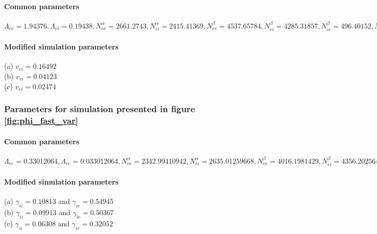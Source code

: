 \documentclass[a4paper,12pt]{article}
\begin{document}
\paragraph{Common parameters}
$\Lambda_{ee} = 1.94376, \Lambda_{ei} = 0.19438, N^{\alpha}_{ee} = 2661.2743, N^{\alpha}_{ei} = 2415.41369,
N^{\beta}_{ee} = 4537.65784, N^{\beta}_{ei} = 4285.31857, N^{\beta}_{ie} = 496.40152, N^{\beta}_{ii} = 989.81774,
\Gamma_{ee} = 0.42627, \Gamma_{ei} = 1.71876, \Gamma_{ie} = 0.85708, \Gamma_{ii} = 1.32239,
\gamma_{ee} = 0.78950, \gamma_{ei} = 0.82632, \gamma_{ie} = 0.14777,
\gamma_{ii} = 0.04887, h_e^{rest} = -75.54581, h_{ee}^{eq} = -16.50733, h_{ei}^{eq} = -2.72987,
h_i^{rest} = -75.55675, h_{ie}^{eq} = -88.67197, h_{ii}^{eq} = -85.43396, \mu_e = -42.50181, \mu_i = -48.70101, 
p_{ee} = 7.18587, p_{ei} = 6.79444, p_{ie} = 0.0, p_{ii} = 0.0, phi_{ie} = 0,
\phi_{ii} = 0, S_e^{max} = 0.45018, S_i^{max} = 0.07468, \sigma_e = 5.02482,
\sigma_i = 3.22531, \tau_e = 38.9, \tau_i = 137.859, v_{ee} = 0.82458$
\paragraph{Modified simulation parameters}
(a) $v_{ei} = 0.16492$\\
(b) $v_{ei} = 0.04123$\\
(c) $v_{ei} = 0.02474$\\


\subsubsection{Parameters for simulation presented in figure \ref{fig:phi_fast_var}}
\paragraph{Common parameters}
$\Lambda_{ee} = 0.33012064, \Lambda_{ee} = 0.033012064, N^{\alpha}_{ee} =  2342.99410942, N^{\alpha}_{ei} =  2635.01259668,
N^{\beta}_{ee} =  4016.1981429, N^{\beta}_{ei} =  4356.20256437, N^{\beta}_{ie} =  634.73935613, N^{\beta}_{ii} =  473.38388612,
\Gamma_{ee} = 0.13699266, \Gamma_{ei} = 0.4439827, \Gamma_{ie} = 2.85705762, \Gamma_{ii} = 0.28147566, \gamma_{ee} = 0.244953287255, \gamma_{ei} = 0.82969594, h_e^{rest} = -61.7485641, h_{ee}^{eq} = 5.73011624, h_{ei}^{eq} = 2.099135,
h_i^{rest} = -64.46142322, h_{ie}^{eq} = -81.67044311, h_{ii}^{eq} = -82.29433835, \mu_e = -53.10048735, \mu_i = -53.68380602, p_{ee} = 3.6997382629, p_{ei} = 0.60015865013, p_{ie} = 0.0, p_{ii} = 0.0, \phi_{ie} = 0,
\phi_{ii} = 0, S_e^{max} = 0.0930382, S_i^{max}= 0.0648537, \sigma_e = 4.64535035,
\sigma_i = 3.10925431, \tau_e = 86.1876, \tau_i = 65.0391, \tau^{slow} = 1, v_{ee} = 0.160606,
  v_{ei} = 0.160606$

\paragraph{Modified simulation parameters}
(a) $\gamma_{ii} = 0.10813$ and $\gamma_{ie} = 0.54945$\\
(b) $\gamma_{ii} = 0.09913$ and $\gamma_{ie} = 0.50367$\\
(c) $\gamma_{ii} = 0.06308$ and $\gamma_{ie} = 0.32052$\\


\end{document}
